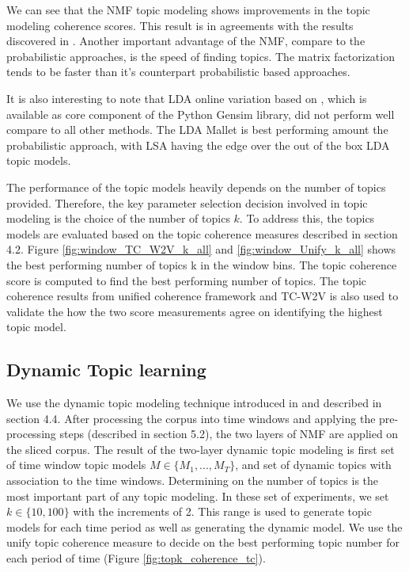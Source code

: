 We can see that the NMF topic modeling shows improvements in the topic modeling coherence scores. This result is in agreements with the results discovered in \cite{Greene2016}. Another important advantage of the NMF, compare to the probabilistic approaches, is the speed of finding topics. The matrix factorization tends to be faster than it's counterpart probabilistic based approaches.


It is also interesting to note that LDA online variation based on \cite{NIPS2010_3902}, which is available as core component of the Python Gensim library, did not perform well compare to all other methods. The LDA Mallet is best performing amount the probabilistic approach, with LSA having the edge over the out of the box LDA topic models. 


The performance of the topic models heavily depends on the number of topics provided. Therefore, the key parameter selection decision involved in topic modeling is the choice of the number of topics $k$. To address this, the topics models are evaluated based on the topic coherence measures described in section 4.2. Figure \ref{fig:window_TC_W2V_k_all} and \ref{fig:window_Unify_k_all} shows the best performing number of topics k in the window bins. The topic coherence score is computed to find the best performing number of topics. The topic coherence results from unified coherence framework and TC-W2V is also used to validate the how the two score measurements agree on identifying the highest topic model. 

\subsection{Dynamic Topic learning}
We use the dynamic topic modeling technique introduced in \cite{Greene2016} and described in section 4.4. After processing the corpus into time windows and applying the pre-processing steps (described in section 5.2), the two layers of NMF are applied on the sliced corpus. The result of the two-layer dynamic topic modeling is first set of time window topic models $M \in \{M_1, ..., M_T\}$, and set of dynamic topics with association to the time windows. 
Determining on the number of topics is the most important part of any topic modeling. In these set of experiments, we set $k \in \{10, 100\}$ with the increments of 2. This range is used to generate topic models for each time period as well as generating the dynamic model. We use the unify topic coherence measure to decide on the best performing topic number for each period of time (Figure \ref{fig:topk_coherence_tc}).

